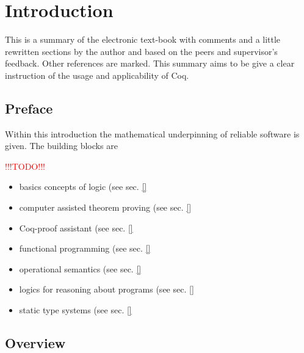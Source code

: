 \section{Introduction}
\label{sec:Introduction}

This is a summary of the electronic text-book \cite{PACGGHSY} with comments and a little rewritten sections by the author and based on the peers and supervisor's feedback. 
Other references are marked. 
This summary aims to be give a clear instruction of the usage and applicability of Coq.\\

\subsection{Preface}
\label{subsec:preface}

Within this introduction the mathematical underpinning of reliable software is given.
The building blocks are

\textcolor{red}{!!!TODO!!!}

\begin{itemize}
\item basics concepts of logic (see sec. \ref{} %
\item computer assisted theorem proving (see sec. \ref{} %
\item Coq-proof assistant (see sec. \ref{} %
\item functional programming (see sec. \ref{} %
\item operational semantics (see sec. \ref{} %
\item logics for reasoning about programs (see sec. \ref{} %
\item static type systems (see sec. \ref{} %
\end{itemize} 


\subsection{Overview}
\label{subsec:Overview}

